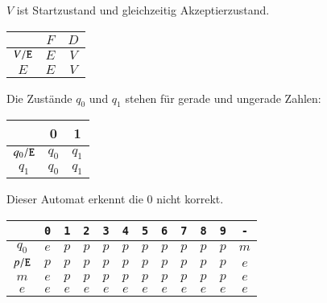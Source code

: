 \begin{beispiel}[\bf Drehkreuz] $V$ ist Startzustand und gleichzeitig
Akzeptierzustand.

\begin{center}
\begin{tabular}{|c|cc|}
\hline
&$F$&$D$\\
\hline
$V{\tt /E}$&$E$&$V$\\
$E$&$E$&$V$\\
\hline
\end{tabular}
\end{center}

\end{beispiel}

\begin{beispiel}
Die Zustände $q_0$ und $q_1$ stehen für gerade und ungerade Zahlen:

\begin{center}
\begin{tabular}{|c|cc|}
\hline
&0&1\\
\hline
$q_0{\tt /E}$&$q_0$&$q_1$\\
$q_1$&$q_0$&$q_1$\\
\hline
\end{tabular}
\end{center}

\end{beispiel}

\begin{beispiel} Dieser Automat erkennt die $0$
nicht korrekt.

\begin{center}
\begin{tabular}{|c|ccccccccccc|}
\hline
&\tt 0&\tt 1&\tt 2&\tt 3&\tt 4&\tt 5&\tt 6&\tt 7&\tt 8&\tt 9&\tt -\\
\hline
$q_0$&$e$&$p$&$p$&$p$&$p$&$p$&$p$&$p$&$p$&$p$&$m$\\
$p{\tt /E}$&$p$&$p$&$p$&$p$&$p$&$p$&$p$&$p$&$p$&$p$&$e$\\
$m$&$e$&$p$&$p$&$p$&$p$&$p$&$p$&$p$&$p$&$p$&$e$\\
$e$&$e$&$e$&$e$&$e$&$e$&$e$&$e$&$e$&$e$&$e$&$e$\\
\hline
\end{tabular}
\end{center}

\end{beispiel}

